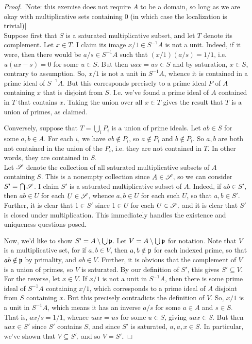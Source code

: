 \begin{proof}
	{[Note: this exercise does not require $A$ to be a domain, so long as we are okay with multiplicative sets containing $0$ (in which case the localization is trivial)]} \\
	
	Suppose first that $S$ is a saturated multiplicative subset, and let $T$ denote its complement. Let $x \in T$. I claim its image $x/1 \in S^{-1}A$ is not a unit. Indeed, if it were, then there would be $a/s \in S^{-1}A$ such that $(x/1)(a/s) = 1/1$, i.e. $u(ax-s) = 0$ for some $u \in S$. But then $uax = us \in S$ and by saturation, $x \in S$, contrary to assumption. So, $x/1$ is not a unit in $S^{-1}A$, whence it is contained in a prime ideal of $S^{-1}A$. But this corresponds precisely to a prime ideal $P$ of $A$ containing $x$ that is disjoint from $S$. I.e. we've found a prime ideal of $A$ contained in $T$ that contains $x$. Taking the union over all $x \in T$ gives the result that $T$ is a union of primes, as claimed.
	
	Conversely, suppose that $T = \bigcup_i P_i$ is a union of prime ideals. Let $ab \in S$ for some $a,b \in A$. For each $i$, we have $ab \notin P_i$, so $a \notin P_i$ and $b \notin P_i$. So $a,b$ are both not contained in the union of the $P_i$, i.e. they are not contained in $T$. In other words, they are contained in $S$. \\
	
	Let $\mathscr{S}$ denote the collection of all saturated multiplicative subsets of $A$ containing $S$. This is a nonempty collection since $A \in \mathscr{S}$, so we can consider $S' = \bigcap \mathscr{S}$. I claim $S'$ is a saturated multiplicative subset of $A$. Indeed, if $ab \in S'$, then $ab \in U$ for each $U \in \mathscr{S}$, whence $a,b \in U$ for each such $U$, so that $a,b \in S'$. Further, it is clear that $1 \in S'$ since $1 \in U$ for each $U \in \mathscr{S}$, and it is clear that $S'$ is closed under multiplication. This immediately handles the existence and uniqueness questions posed.
	
	Now, we'd like to show $S' = A \setminus \bigcup \mathfrak{p}$. Let $V = A \setminus \bigcup \mathfrak{p}$ for notation. Note that $V$ is a multiplicative set, for if $a,b \in V$, then $a,b \notin \mathfrak{p}$ for each indexed prime, so that $ab \notin \mathfrak{p}$ by primality, and $ab \in V$. Further, it is obvious that the complement of $V$ is a union of primes, so $V$ is saturated. By our definition of $S'$, this gives $S' \subseteq V$. For the reverse, let $x \in V$. If $x/1$ is not a unit in $S^{-1}A$, then there is some prime ideal of $S^{-1}A$ containing $x/1$, which corresponds to a prime ideal of $A$ disjoint from $S$ containing $x$. But this precisely contradicts the definition of $V$. So, $x/1$ is a unit in $S^{-1}A$, which means it has an inverse $a/s$ for some $a \in A$ and $s \in S$. That is, $ax/s = 1/1$, whence $uax = us$ for some $u \in S$, giving $uax \in S$. But then $uax \in S'$ since $S'$ contains $S$, and since $S'$ is saturated, $u,a,x \in S$. In particular, we've shown that $V \subseteq S'$, and so $V = S'$.
	

\end{proof}
